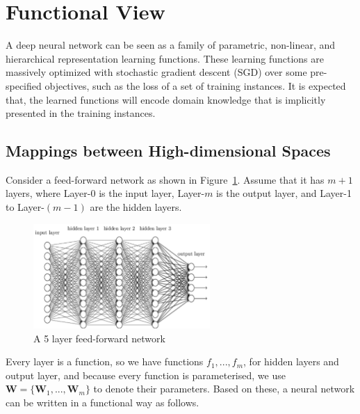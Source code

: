 \section{Functional View}

A deep neural network can be seen as a family of parametric, non-linear, and hierarchical representation learning functions. These learning functions are massively optimized with stochastic gradient descent (SGD) over some pre-specified objectives, such as the loss of a set of training instances. It is expected that, the learned functions will encode domain knowledge that is implicitly presented in the training instances. 


\subsection{Mappings between High-dimensional Spaces}

Consider a feed-forward network as shown in Figure~\ref{fig:feedforward}. Assume that it has $m+1$ layers, where Layer-0 is the input layer,  Layer-$m$ is the output layer, and Layer-1 to Layer-$(m-1)$ are the hidden layers. 

\begin{figure}[!htbp]
    \centering
    \includegraphics[width=0.6\textwidth]{images/deepLearning/functionalView/nn.png}
    \caption{A 5 layer feed-forward network}
    \label{fig:feedforward}
\end{figure}

Every layer is a function, so we have functions $f_1,...,f_{m}$, for hidden layers and output layer, and because every function is parameterised, we use $\textbf{W}=\{\textbf{W}_1,...,\textbf{W}_m\}$ to denote their parameters. Based on these, a neural network can be written in a functional way as follows. 

